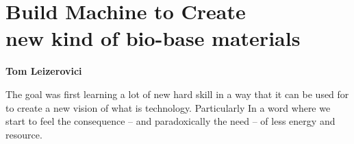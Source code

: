\chapter*{\centering \Huge Build Machine to Create \\
new kind of bio-base materials }

\begin{center}
    \textbf{Tom Leizerovici} 
\end{center} 
The goal was first learning a lot of new hard skill in a way that it can be used for to create a new vision of what is technology. Particularly In a word where we start to feel the consequence -- and paradoxically the need -- 
of less energy and resource. 



\pagebreak

